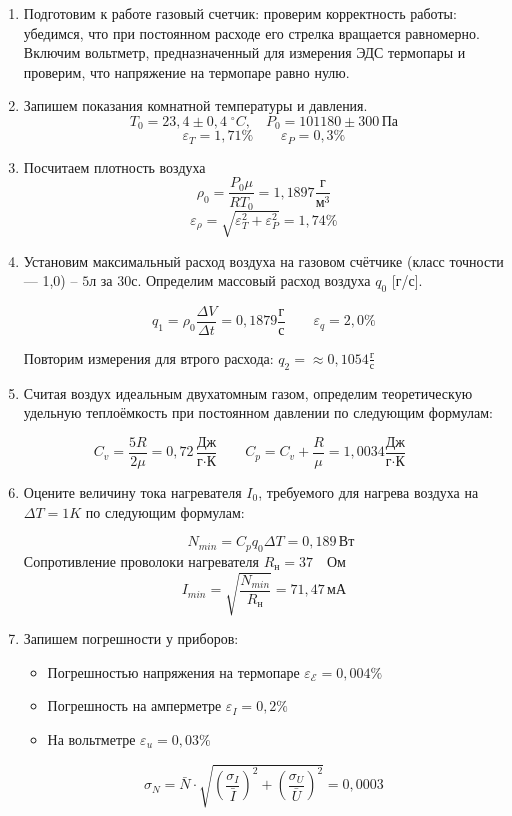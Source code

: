 \documentclass[a4paper,12pt]{article}
\begin{document}
        \begin{enumerate}
		\item Подготовим к работе газовый счетчик: проверим корректность работы: убедимся, что при постоянном расходе его стрелка вращается равномерно. Включим вольтметр,
        предназначенный для измерения ЭДС термопары и проверим, что напряжение на термопаре равно нулю.
		
		\item Запишем показания комнатной температуры и давления. $$T_{0} = 23,4 \pm 0,4 \; ^\circ C, \quad P_{0} = 101180 \pm 300 \, \text{Па} $$
        \[\varepsilon_T = 1,71 \% \quad \quad \varepsilon_P = 0,3 \%\]
        
            \item Посчитаем плотность воздуха 
            \[
            \rho_0  = \frac{P_0\mu}{RT_0} = 1, 1897 \frac{\text{г}}{\text{м}^3}
            \]
            \[\varepsilon_{\rho} = \sqrt{\varepsilon^2_T + \varepsilon^2_P} = 1,74 \% \]

		\item Установим максимальный расход воздуха на газовом счётчике (класс точности --- 1,0) -- $5$л за $30 $с. Определим массовый расход воздуха $q_{0}$ [г/с].
		
		\[q_1 = \rho_0 \frac{\Delta V}{\Delta t} = 0,1879 \frac{\text{г}}{\text{с}} \quad  \quad \varepsilon_q = 2,0 \%\]

            Повторим измерения для втрого расхода: \(q_2 = ≈ 0, 1054 \frac{\text{г}}{\text{с}}\)

            \item Считая воздух идеальным двухатомным газом, определим теоретическую удельную теплоёмкость при постоянном давлении по следующим формулам:

            \[
            C_v = \frac{5R}{2\mu} = 0,72 \, \frac{\text{Дж}}{\text{г} \cdot \text{К}}  \quad \quad C_p = C_v + \frac{R}{\mu} = 1,0034 \frac{\text{Дж}}{\text{г} \cdot \text{К}} \quad \quad 
            \]
            
		\item Оцените величину тока нагревателя $I_0$, требуемого для нагрева воздуха
            на $\Delta T = 1K$ по следующим формулам:

            \[
                 \quad N_{min} = C_pq_0\Delta T = 0,189 \, \text{Вт}
            \]
                Сопротивление проволоки нагревателя $R_{\text{н}} = 37 \quad \text{Ом}$
            \[I_{min} = \sqrt{\frac{N_{min}}{R_{\text{н}}}} = 71,47 \,\text{мА}\]
            \item  Запишем погрешности у приборов:
                \begin{itemize}
                    \item Погрешностью напряжения на термопаре  $\varepsilon_{\mathcal{E}} = 0,004 \%$
                    \item Погрешность на амперметре $\varepsilon_I = 0,2 \%$
                    \item На вольтметре $\varepsilon_u = 0,03 \%$
                \end{itemize}
            \[
            \sigma_N = \bar{N} \cdot \sqrt{\left( \frac{\sigma_I}{\bar{I}} \right)^2 + \left( \frac{\sigma_U}{\bar{U}} \right)^2} = 0,0003
            \]


\end{enumerate}
\end{document}
